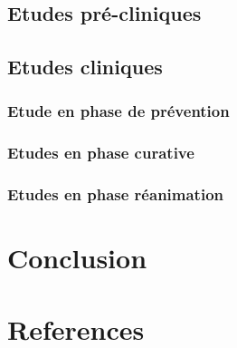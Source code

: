 \documentclass[
  letterpaper,
  DIV=11,
  numbers=noendperiod]{scrartcl}
\begin{document}
\hypertarget{etudes-pruxe9-cliniques}{%
\subsection{Etudes pré-cliniques}\label{etudes-pruxe9-cliniques}}

\hypertarget{etudes-cliniques}{%
\subsection{Etudes cliniques}\label{etudes-cliniques}}

\hypertarget{etude-en-phase-de-pruxe9vention}{%
\subsubsection{Etude en phase de
prévention}\label{etude-en-phase-de-pruxe9vention}}

\hypertarget{etudes-en-phase-curative}{%
\subsubsection{Etudes en phase
curative}\label{etudes-en-phase-curative}}

\hypertarget{etudes-en-phase-ruxe9animation}{%
\subsubsection{Etudes en phase
réanimation}\label{etudes-en-phase-ruxe9animation}}

\newpage{}

\hypertarget{conclusion}{%
\section{Conclusion}\label{conclusion}}

\newpage{}

\hypertarget{references}{%
\section*{References}\label{references}}
\end{document}
